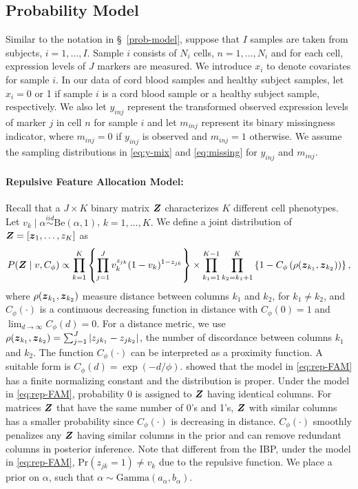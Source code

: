 \documentclass[12pt,]{article}
\newcommand{\p}[1]{\left(#1\right)}
\newcommand{\bc}[1]{ \left\{#1\right\} }
\newcommand{\abs}[1]{ \left|#1\right| }
\newcommand{\iid}{\overset{iid}{\sim}}
\def\Be{\text{Be}}
\def\Prob{\text{Pr}}
\newcommand{\bZ}{\mbox{\boldmath $Z$}}
\newcommand{\bz}{\mbox{\boldmath $z$}}
\begin{document}


\subsection{Probability Model}\label{sec:rep-model}
Similar to the notation in \S~\ref{prob-model}, suppose that $I$ samples are
taken from subjects, \(i = 1,...,I\). Sample \(i\)
consists of \(N_i\) cells, \(n=1, \ldots, N_i\) and for each cell,
expression levels of \(J\) markers are measured.  We introduce $x_i$ to denote
covariates for sample $i$.  In our data of cord blood samples and healthy
subject samples, let $x_i=0$ or 1 if sample $i$ is a cord blood sample or a
healthy subject sample, respectively.  We also let $y_{inj}$ represent the
transformed observed expression levels of marker $j$ in cell $n$ for sample $i$
and let $m_{inj}$ represent its binary missingness indicator, where $m_{inj} =
0$ if $y_{inj}$ is observed and $m_{inj} = 1$ otherwise.  We assume the
sampling distributions in \eqref{eq:y-mix} and \eqref{eq:missing} for $y_{inj}$
and $m_{inj}$.

\paragraph*{Repulsive Feature Allocation Model:} Recall that a $J\times K$ binary
matrix $\bZ$ characterizes $K$ different cell phenotypes.  Let $v_k \mid \alpha
\iid \Be(\alpha, 1)$, $k=1, \ldots, K.$ We define a joint distribution of
$\bZ=[\bz_1, \ldots, z_K]$ as
\begin{eqnarray}
P(\bZ \mid v, C_\phi) \propto \prod_{k=1}^K  \bc{\prod_{j=1}^J
v_k^{z_{jk}}(1-v_k)^{1-z_{jk}}} \times
\prod_{k_1=1}^{K-1}\prod_{k_2=k_1+1}^{K} \left\{1 - C_\phi\p{\rho(\bz_{k_1},
\bz_{k_2})}\right\},  \label{eq:rep-FAM}
\end{eqnarray}
where $\rho(\bz_{k_1}, \bz_{k_2})$ measure distance between columns $k_1$ and
$k_2$, for $k_1 \neq k_2$, and $C_\phi(\cdot)$ is a continuous decreasing
function in distance with $C_\phi(0)=1$ and
$\lim_{d\rightarrow\infty}C_\phi(d)= 0$. For a distance metric, we use
$\rho(\bz_{k_1}, \bz_{k_2})=\sum_{j=1}^J \abs{z_{jk_1} - z_{jk_2}}$, the number
of discordance between columns $k_1$ and $k_2$.  The function $C_\phi(\cdot)$
can be interpreted as a proximity function. A suitable form is $C_\phi(d) =
\exp\p{-d/\phi}$. \cite{quinlan2017parsimonious} showed that the model in
\eqref{eq:rep-FAM} has a finite normalizing constant and the distribution is
proper.  Under the model in \eqref{eq:rep-FAM}, probability 0 is assigned to
$\bZ$ having identical columns.  For matrices $\bZ$ that have the same number
of 0's and 1's, $\bZ$ with similar columns has a smaller probability since
$C_\phi(\cdot)$ is decreasing in distance. $C_\phi(\cdot)$ smoothly penalizes
any $\bZ$ having similar columns in the prior and can remove redundant columns in
posterior inference. Note that different from the IBP, under the model in
\eqref{eq:rep-FAM}, $\Prob(z_{jk}=1) \neq v_k$ due to the repulsive function.
We place a prior on $\alpha$, such that $\alpha \sim \text{Gamma}(a_\alpha,
b_\alpha)$.
\end{document}
